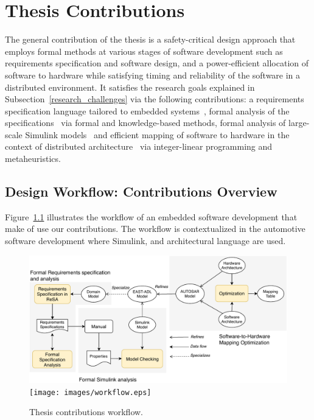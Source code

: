\chapter{Thesis Contributions}
The general contribution of the thesis is a safety-critical design approach that employs formal methods at various stages of software development such as requirements specification and software design, and a power-efficient allocation of software to hardware while satisfying timing and reliability of the software in a distributed environment. It satisfies the research goals explained in Subsection~\ref{research_challenges} via the following contributions: a requirements specification language tailored to embedded systems~\cite{Mahmud2015ReSA:Systems}\cite{resatool}, formal analysis of the specifications~\cite{resatool}\cite{Mahmud2017SpecificationLogic} via formal and knowledge-based methods, formal analysis of large-scale Simulink models~\cite{Filipovikj2018SimppaalModels} and efficient mapping of software to hardware in the context of distributed architecture~\cite{Mahmud5222}\cite{Mahmud2019Power-awareOptimization} via integer-linear programming and metaheuristics. 

\section{Design Workflow: Contributions Overview}
Figure~\ref{fig_workflow} illustrates the workflow of an embedded software development that make of use our contributions. The workflow is contextualized in the automotive software development where Simulink, \eastadl{} and \autosar{} architectural language are used. 
\begin{figure}
	\centering
	\ifpdf
	\includegraphics[width=\linewidth]{images/workflow}
	\else
	\texttt{[image: images/workflow.eps]}
	\fi
	\caption{Thesis contributions workflow.} 
	\label{fig_workflow}
\end{figure}

